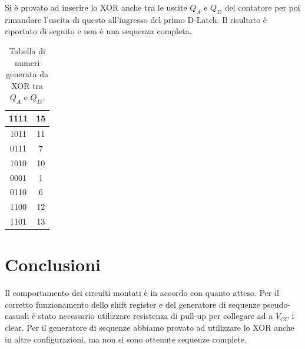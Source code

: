 \documentclass[10pt,a4paper]{article}
\begin{document}
Si è provato ad inserire lo XOR anche tra le uscite $Q_A$ e $Q_D$ del contatore per poi rimandare l'uscita di questo all'ingresso del primo D-Latch. Il risultato è riportato di seguito e non è una sequenza completa.

\begin{table}[!htb]
\centering
\begin{tabular}{|c|c|}
\hline 
1111 & 15 \\ 
\hline 
1011 & 11 \\ 
\hline 
0111 & 7 \\ 
\hline 
1010 & 10 \\ 
\hline 
0001 & 1 \\ 
\hline 
0110 & 6 \\ 
\hline 
1100 & 12 \\ 
\hline 
1101 & 13 \\ 
\hline 
\end{tabular}
\caption{Tabella di numeri generata da XOR tra $Q_A$ e $Q_D$.\label{AD}}  
\end{table}

\section{Conclusioni}
Il comportamento dei circuiti montati è in accordo con quanto atteso. Per il corretto funzionamento dello shift register e del generatore di sequenze pseudo-casuali è stato necessario utilizzare resistenza di pull-up per collegare ad a $V_{CC}$ i clear.
Per il generatore di sequenze abbiamo provato ad utilizzare lo XOR anche in altre configurazioni, ma non si sono ottenute sequenze complete.
\end{document}
